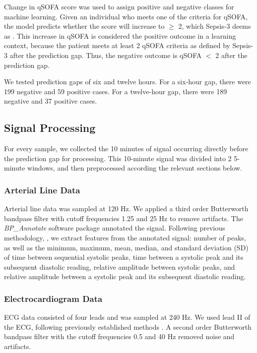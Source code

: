 Change in qSOFA score was used to assign positive and negative classes for machine learning. Given an individual who meets one of the criteria for qSOFA, the model predicts whether the score will increase to $\geq$ 2, which Sepsis-3 deems as  \autocite{sepsis-3}. This increase in qSOFA is considered the positive outcome in a learning context, because the patient meets at least 2 qSOFA criteria as defined by Sepsis-3 after the prediction gap. Thus, the negative outcome is qSOFA $<$ 2 after the prediction gap.

We tested prediction gaps of six and twelve hours. For a six-hour gap, there were 199 negative and 59 positive cases. For a twelve-hour gap, there were 189 negative and 37 positive cases.

\subsection*{Signal Processing} \label{sec:methods_sigproc}
For every sample, we collected the 10 minutes of signal occurring directly before the prediction gap for processing. This 10-minute signal was divided into 2 5-minute windows, and then preprocessed according the relevant sections below.

\subsubsection*{Arterial Line Data} \label{sec:methods_art_data}
Arterial line data was sampled at 120 Hz. We applied a third order Butterworth bandpass filter with cutoff frequencies 1.25 and 25 Hz  to remove artifacts. The \textit{BP\_Annotate} software package \autocite{laurin_bp_annotate_2017} annotated the signal. Following previous methodology, \autocite{luo_severity_2012, hernandez_multimodal_2021}, we extract features from the annotated signal: number of peaks, as well as the minimum, maximum, mean, median, and standard deviation (SD) of time between sequential systolic peaks, time between a systolic peak and its subsequent diastolic reading, relative amplitude between systolic peaks, and relative amplitude between a systolic peak and its subsequent diastolic reading.

\subsubsection*{Electrocardiogram Data} \label{sec:methods_ecg_data}
ECG data consisted of four leads and was sampled at 240 Hz. We used lead II of the ECG, following previously established methods \autocite{belle_signal_2016}. A second order Butterworth bandpass filter with the cutoff frequencies 0.5 and 40 Hz removed noise and artifacts.

